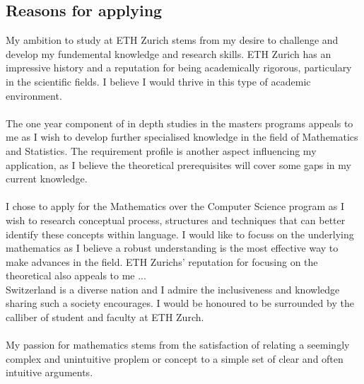 \subsection*{Reasons for applying}
My ambition to study at ETH Zurich stems from my desire to challenge and develop my fundemental knowledge and research skills. ETH Zurich has an impressive history and a reputation for being academically rigorous, particulary in the scientific fields. I believe I would thrive in this type of academic environment.\\
\\
The one year component of in depth studies in the masters programs appeals to me as I wish to develop further specialised knowledge in the field of Mathematics and Statistics. The requirement profile is another aspect influencing my application, as I believe the theoretical prerequisites will cover some gaps in my current knowledge.\\
\\
I chose to apply for the Mathematics over the Computer Science program as I wish to research conceptual process, structures and techniques that can better identify these concepts within language. I would like to focuss on the underlying mathematics as I believe a robust understanding is the most effective way to make advances in the field. ETH Zurichs' reputation for focusing on the theoretical also appeals to me ...
\\
Switzerland is a diverse nation and I admire the inclusiveness and knowledge sharing such a society encourages.  I would be honoured to be surrounded by the calliber of student and faculty at ETH Zurch.\\
\\
My passion for mathematics stems from the satisfaction of relating a seemingly complex and unintuitive proplem or concept to a simple set of clear and often intuitive arguments.\\
